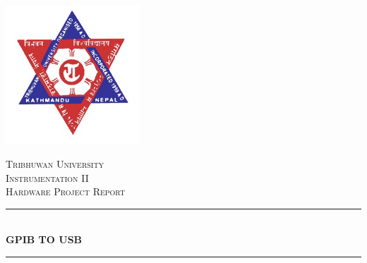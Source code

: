 \documentclass[12pt]{article}
\begin{document}
\begin{titlepage}

\newcommand{\HRule}{\rule{\linewidth}{0.5mm}} %

\center %

\includegraphics[width=50mm]{tu.jpg} %
 



\textsc{\LARGE Tribhuwan University}\\[1.5cm] %
\textsc{\Large Instrumentation II}\\[0.5cm] %
\textsc{\large Hardware Project Report}\\[0.5cm] %


\HRule \\[0.2cm]
{ \huge \bfseries GPIB TO USB}\\[0.4cm] %
\HRule \\[1.5cm]
 


\end{titlepage}
\end{document}

